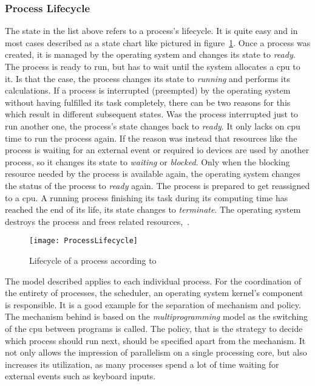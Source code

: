 \subsubsection*{Process Lifecycle}
The state in the list above refers to a process's lifecycle.
It is quite easy and in most cases described as a state chart like pictured in figure~\ref{pic:process-lifecycle}.
Once a process was created, it is managed by the operating system and changes its state to \textit{ready}.
The process is ready to run, but has to wait until the system allocates a \ac{cpu} to it.
Is that the case, the process changes its state to \textit{running} and performs its calculations.
If a process is interrupted (preempted) by the operating system without having fulfilled its task completely, there can be two reasons for this which result in different subsequent states.
Was the process interrupted just to run another one, the process's state changes back to \textit{ready}. 
It only lacks on \ac{cpu} time to run the process again.
If the reason was instead that resources like the process is waiting for an external event or required \ac{io} devices are used by another process, so it changes its state to \textit{waiting} or \textit{blocked}. 
Only when the blocking resource needed by the process is available again, the operating system changes the status of the process to \textit{ready} again.
The process is prepared to get reassigned to a \ac{cpu}.
A running process finishing its task during its computing time has reached the end of its life, its state changes to \textit{terminate}.
The operating system destroys the process and frees related resources\cite{silberschatz2009operating},~\cite{mandl2014Grundkurs}.

\begin{figure} [t]
	\centering
	\texttt{[image: ProcessLifecycle]}
    \caption{Lifecycle of a process according to~\label{pic:process-lifecycle}\cite{silberschatz2009operating}}
\end{figure}

The model described applies to each individual process.
For the coordination of the entirety of processes, the scheduler, an operating system kernel's component is responsible.
It is a good example for the separation of mechanism and policy.
The mechanism behind is based on the \textit{multiprogramming} model as the switching of the \ac{cpu} between programs is called.
The policy, that is the strategy to decide which process should run next, should be specified apart from the mechanism. 
It not only allows the impression of parallelism on a single processing core, but also increases its utilization, as many processes spend a lot of time waiting for external events such as keyboard inputs\cite{tanenbaum-modern-operating-systems}.

